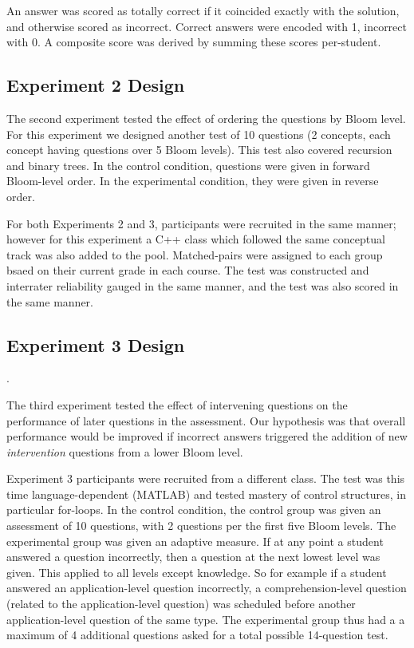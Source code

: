 An answer was scored as totally correct if it coincided exactly with the
solution, and otherwise scored as incorrect. Correct answers were encoded with
1, incorrect with 0.  A composite score was derived by summing these scores
per-student.

\subsection{Experiment 2 Design}

The second experiment tested the effect of ordering the questions by Bloom
level.  For this experiment we designed another test of 10 questions (2
concepts, each concept having questions over 5 Bloom levels).  This test also
covered recursion and binary trees. In the control condition, questions were
given in forward Bloom-level order.  In the experimental condition, they were
given in reverse order.

For both Experiments 2 and 3, participants were recruited in the same manner;
however for this experiment a C++ class which followed the same conceptual
track was also added to the pool. Matched-pairs were assigned to each group
bsaed on their current grade in each course.  The test was constructed and
interrater reliability gauged in the same manner, and the test was also scored
in the same manner.

\subsection{Experiment 3 Design}. 

The third experiment tested the effect of intervening questions on the
performance of later questions in the assessment.  Our hypothesis was that
overall performance would be improved if incorrect answers triggered the
addition of new {\em intervention} questions from a lower Bloom level.

Experiment 3 participants were recruited from a different class. The test was
this time language-dependent (MATLAB) and tested mastery of control structures,
in particular for-loops.  In the control condition, the control group was given
an assessment of 10 questions, with 2 questions per the first five Bloom
levels. The experimental group was given an adaptive measure.  If at any point
a student answered a question incorrectly, then a question at the next lowest
level was given.  This applied to all levels except knowledge.  So for example
if a student answered an application-level question incorrectly, a
comprehension-level question (related to the application-level question) was
scheduled before another application-level question of the same type.  The
experimental group thus had a a maximum of 4 additional questions asked for a
total possible 14-question test.

